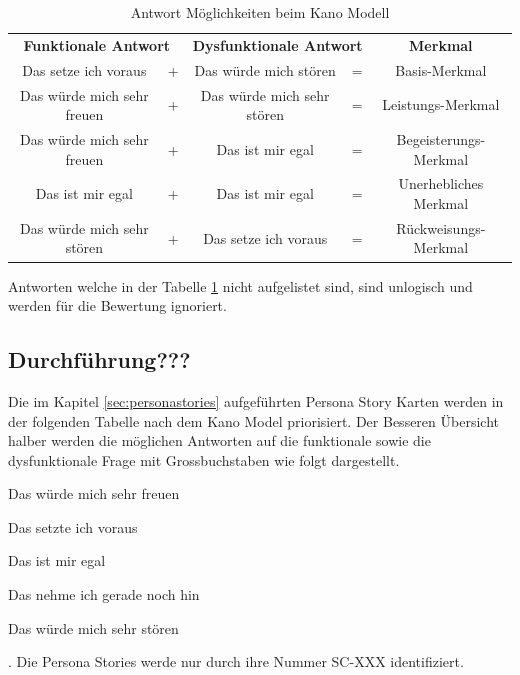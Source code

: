 \begin{table}[h!]
\centering
\label{tbl:kanoantworten}
\begin{tabular}{clclc}
\multicolumn{2}{c}{\textbf{Funktionale Antwort}} & \multicolumn{2}{c}{\textbf{Dysfunktionale Antwort}} & \textbf{Merkmal}      \\
Das setze ich voraus                & +          & Das würde mich stören                 & =           & Basis-Merkmal         \\
Das würde mich sehr freuen          & +          & Das würde mich sehr stören            & =           & Leistungs-Merkmal     \\
Das würde mich sehr freuen          & +          & Das ist mir egal                      & =           & Begeisterungs-Merkmal \\
Das ist mir egal                    & +          & Das ist mir egal                      & =           & Unerhebliches Merkmal \\
Das würde mich sehr stören          & +          & Das setze ich voraus                  & =           & Rückweisungs-Merkmal
\end{tabular}
\caption{Antwort Möglichkeiten beim Kano Modell}
\end{table}

Antworten welche in der Tabelle \ref{tbl:kanoantworten} nicht aufgelistet sind, sind unlogisch und werden für die Bewertung ignoriert.

\subsection{Durchführung???}
Die im Kapitel \ref{sec:personastories} aufgeführten Persona Story Karten werden in der folgenden Tabelle nach dem Kano Model priorisiert. Der Besseren Übersicht halber werden die möglichen Antworten auf die funktionale sowie die dysfunktionale Frage mit Grossbuchstaben wie folgt dargestellt.
\begin{enumerate*}[label={\Alph*)},font={\color{red!50!black}\bfseries}]
	\item Das würde mich sehr freuen
	\item Das setzte ich voraus
	\item Das ist mir egal
	\item Das nehme ich gerade noch hin
	\item Das würde mich sehr stören
\end{enumerate*}. Die Persona Stories werde nur durch ihre Nummer SC-XXX identifiziert.

